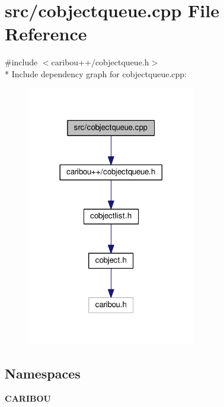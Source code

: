 \section{src/cobjectqueue.cpp File Reference}
\label{cobjectqueue_8cpp}
{\ttfamily \#include $<$caribou++/cobjectqueue.\+h$>$}\\*
Include dependency graph for cobjectqueue.\+cpp\+:
\nopagebreak
\begin{figure}[H]
\begin{center}
\leavevmode
\includegraphics[width=209pt]{cobjectqueue_8cpp__incl}
\end{center}
\end{figure}
\subsection*{Namespaces}
\begin{DoxyCompactItemize}
\item 
 {\bf C\+A\+R\+I\+B\+OU}
\end{DoxyCompactItemize}

